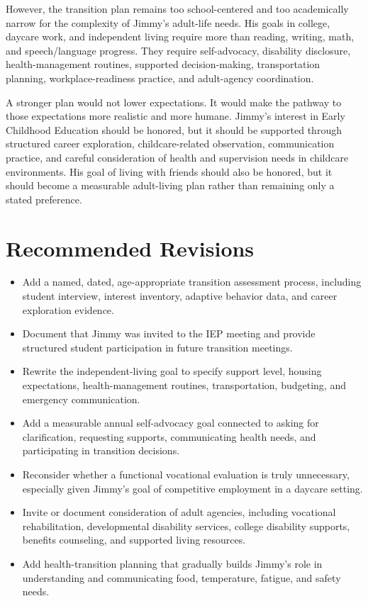 However, the transition plan remains too school-centered and too academically narrow for the complexity of Jimmy's adult-life needs. His goals in college, daycare work, and independent living require more than reading, writing, math, and speech/language progress. They require self-advocacy, disability disclosure, health-management routines, supported decision-making, transportation planning, workplace-readiness practice, and adult-agency coordination.

A stronger plan would not lower expectations. It would make the pathway to those expectations more realistic and more humane. Jimmy's interest in Early Childhood Education should be honored, but it should be supported through structured career exploration, childcare-related observation, communication practice, and careful consideration of health and supervision needs in childcare environments. His goal of living with friends should also be honored, but it should become a measurable adult-living plan rather than remaining only a stated preference.

\section*{Recommended Revisions}

\begin{itemize}
  \item Add a named, dated, age-appropriate transition assessment process, including student interview, interest inventory, adaptive behavior data, and career exploration evidence.
  \item Document that Jimmy was invited to the IEP meeting and provide structured student participation in future transition meetings.
  \item Rewrite the independent-living goal to specify support level, housing expectations, health-management routines, transportation, budgeting, and emergency communication.
  \item Add a measurable annual self-advocacy goal connected to asking for clarification, requesting supports, communicating health needs, and participating in transition decisions.
  \item Reconsider whether a functional vocational evaluation is truly unnecessary, especially given Jimmy's goal of competitive employment in a daycare setting.
  \item Invite or document consideration of adult agencies, including vocational rehabilitation, developmental disability services, college disability supports, benefits counseling, and supported living resources.
  \item Add health-transition planning that gradually builds Jimmy's role in understanding and communicating food, temperature, fatigue, and safety needs.
\end{itemize}

